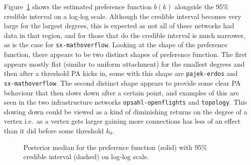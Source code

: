 \documentclass[
  sn-basic,
  10pt,
]{sn-jnl}
\theoremstyle{plain}
\theoremstyle{plain}
\theoremstyle{remark}
\begin{document}
Figure~\ref{fig-pa} shows the estimated preference function \(b(k)\)
alongside the 95\% credible interval on a log-log scale. Although the
credible interval becomes very large for the largest degrees, this is
expected as not all of these networks had data in that region, and for
those that do the credible interval is much narrower, as is the case for
\texttt{sx-mathoverflow}. Looking at the shape of the preference
function, there appears to be two distinct shapes of preference
function. The first appears mostly flat (similar to uniform attachment)
for the smallest degrees and then after a threshold PA kicks in, some
with this shape are \texttt{pajek-erdos} and \texttt{sx-mathoverflow}.
The second distinct shape appears to provide some clear PA behaviour
that then slows down after a certain point, and examples of this are
seen in the two infrastructure networks \texttt{opsahl-openflights} and
\texttt{topology}. This slowing down could be viewed as a kind of
diminishing returns on the degree of a vertex i.e.~as a vertex gets
larger gaining more connections has less of an effect than it did before
some threshold \(k_0\).

\begin{figure}[H]


\caption{\label{fig-pa}Posterior median for the preference function
(solid) with 95\% credible interval (dashed) on log-log scale.}

\end{figure}%

\newpage
\end{document}
